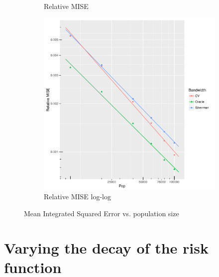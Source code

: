 \begin{figure}[htb]
\begin{subfigure}[b]{0.3\textwidth}
    \caption{Relative MISE}
    \end{subfigure}
    \begin{subfigure}[b]{0.3\textwidth}
    \includegraphics[width=\textwidth]{results/by_pop_size/RMISE-vs-population-log-log}
    \caption{Relative MISE log-log}
    \end{subfigure}
    \caption[MISE: by population size]{Mean Integrated Squared Error vs. population size}
    \label{fig:ise:unifNpop_1h}
\end{figure}


\section{Varying the decay of the risk function}
\label{sec:results:unif_100_SD}

